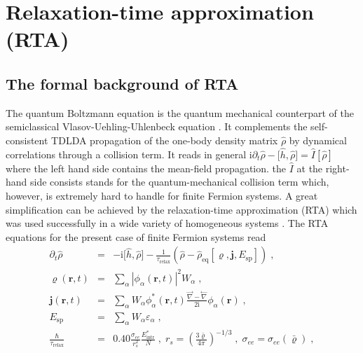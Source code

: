 \documentclass[final,1p]{elsarticle}
\begin{document}
\section{Relaxation-time approximation (RTA)}
\label{sec:RTA}

\subsection{The formal background of RTA}

The quantum Boltzmann equation is the quantum mechanical
counterpart of the
semiclassical Vlasov-Uehling-Uhlenbeck equation \cite{Ber88,Abe96}.
It complements the self-consistent TDLDA propagation 
of the one-body density matrix $\hat{\rho}$ by
dynamical correlations through a collision term. It reads in
general \cite{Rei85f,Goe86a}
$\mathrm{i}\partial_t\hat{\rho}
  -
  \big[\hat{h},\hat{\rho}\big]
  =
  \hat{I}[\hat{\rho}]
$
where the left hand side contains the mean-field propagation. the
$\hat{I}$ at the right-hand side consists stands for the
quantum-mechanical collision term which, however, is extremely hard to
handle for finite Fermion systems. A great simplification can be
achieved by the relaxation-time approximation (RTA) which was used
successfully in a wide variety of homogeneous systems
\cite{Pin66,Ash76}. The RTA equations for the present case of finite
Fermion systems read \cite{Rei15a}
\begin{subequations}
\label{eq:EoMbasic}
\begin{eqnarray}
  \partial_t\hat{\rho}
  &=&
  -\mathrm{i}\big[\hat{h},\hat{\rho}\big]
  -
  \frac{1}{\tau_\mathrm{relax}}
  \left(\hat{\rho}-\hat{\rho}_\mathrm{eq}[\varrho,\mathbf{j},E_\mathrm{sp}]\right)
  \;,
\label{eq:EoMbasicrho}
\\
  \varrho(\mathbf{r},t)
  &=&
  \sum_\alpha \left|\phi_\alpha(\mathbf{r},t)\right|^2 W_\alpha
  \;,
\label{eq:locdens}\\
  \mathbf{j}(\mathbf{r},t)
  &=&
  \sum_\alpha W_\alpha\phi_\alpha^*(\mathbf{r},t)
     \frac{\stackrel{\rightarrow}{\nabla}-\stackrel{\leftarrow}{\nabla}}
          {2\mathrm{i}}
     \phi_\alpha(\mathbf{r})
  \;,
\label{eq:current}\\
  E_\mathrm{sp}
  &=&
  \sum_\alpha W_\alpha\varepsilon_\alpha
  \;,
\\  
  \frac{\hbar}{\tau_\mathrm{relax}}
  &=&
  {0.40}\frac{\sigma_{ee}}{r_s^2}\frac{{E}^*_\mathrm{intr}}{N}
  \;,\;
  r_s=\left(\frac{3\bar{\varrho}}{4\pi}\right)^{-1/3}
  \;,\;
  \sigma_{ee}=\sigma_{ee}(\bar{\varrho})
  \;,
\label{eq:relaxtime}
\end{eqnarray}
\end{subequations}
\end{document}
